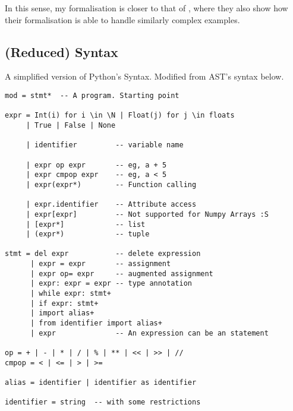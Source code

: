 \begin{Shaded}
\begin{Highlighting}[]
\OperatorTok{=}\NormalTok{ []}
\OperatorTok{=}
\NormalTok{)}
\NormalTok{)}
\end{Highlighting}
\end{Shaded}

In this sense, my formalisation is closer to that of
\textcite{politz_python_2013}, where they also show how their
formalisation is able to handle similarly complex examples.

\subsection{(Reduced) Syntax}\label{reduced-syntax}

A simplified version of Python's Syntax. Modified from AST's syntax
below.

{}

\begin{verbatim}
mod = stmt*  -- A program. Starting point

expr = Int(i) for i \in \N | Float(j) for j \in floats
     | True | False | None

     | identifier         -- variable name

     | expr op expr       -- eg, a + 5
     | expr cmpop expr    -- eg, a < 5
     | expr(expr*)        -- Function calling

     | expr.identifier    -- Attribute access
     | expr[expr]         -- Not supported for Numpy Arrays :S
     | [expr*]            -- list
     | (expr*)            -- tuple

stmt = del expr           -- delete expression
      | expr = expr       -- assignment
      | expr op= expr     -- augmented assignment
      | expr: expr = expr -- type annotation
      | while expr: stmt+
      | if expr: stmt+
      | import alias+
      | from identifier import alias+
      | expr              -- An expression can be an statement

op = + | - | * | / | % | ** | << | >> | //
cmpop = < | <= | > | >=

alias = identifier | identifier as identifier

identifier = string  -- with some restrictions
\end{verbatim}

